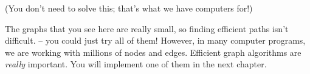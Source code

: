 (You don't need to solve this; that's what we have computers for!)

The graphs that you see here are really small, so finding efficient paths isn't difficult. -- you could just try all of them! However, in many computer programs,  we are working with millions of nodes and edges.  Efficient graph algorithms are \textit{really} important.  You will implement one of them in the next chapter.




